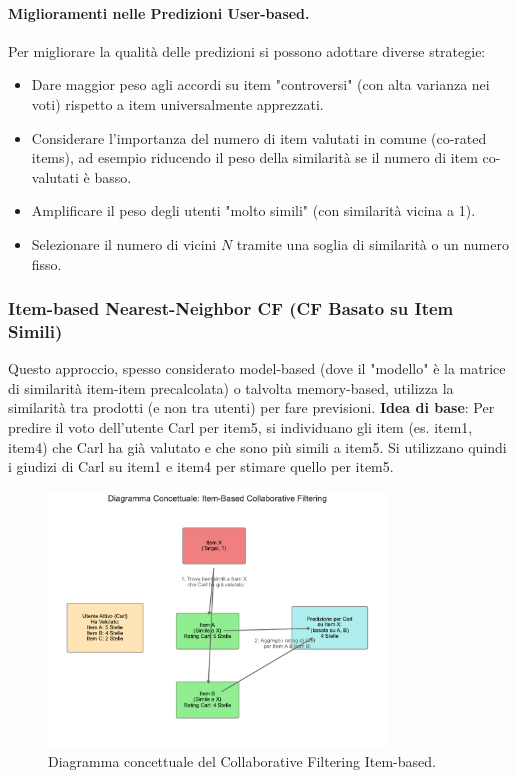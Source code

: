 \documentclass{article}
\begin{document}
\paragraph{Miglioramenti nelle Predizioni User-based.}
Per migliorare la qualità delle predizioni si possono adottare diverse strategie:
\begin{itemize}
    \item Dare maggior peso agli accordi su item "controversi" (con alta varianza nei voti) rispetto a item universalmente apprezzati.
    \item Considerare l'importanza del numero di item valutati in comune (co-rated items), ad esempio riducendo il peso della similarità se il numero di item co-valutati è basso.
    \item Amplificare il peso degli utenti "molto simili" (con similarità vicina a 1).
    \item Selezionare il numero di vicini $N$ tramite una soglia di similarità o un numero fisso.
\end{itemize}

\subsubsection{Item-based Nearest-Neighbor CF (CF Basato su Item Simili)}
Questo approccio, spesso considerato model-based (dove il "modello" è la matrice di similarità item-item precalcolata) o talvolta memory-based, utilizza la similarità tra prodotti (e non tra utenti) per fare previsioni.
\textbf{Idea di base}: Per predire il voto dell'utente Carl per item5, si individuano gli item (es. item1, item4) che Carl ha già valutato e che sono più simili a item5. Si utilizzano quindi i giudizi di Carl su item1 e item4 per stimare quello per item5.


\begin{figure}[H]
    \centering
    \includegraphics[width=0.8\textwidth]{images/item_based_cf_diagram.pdf}
    \caption{Diagramma concettuale del Collaborative Filtering Item-based.}
    \label{fig:item_based_cf}
\end{figure}
\end{document}
